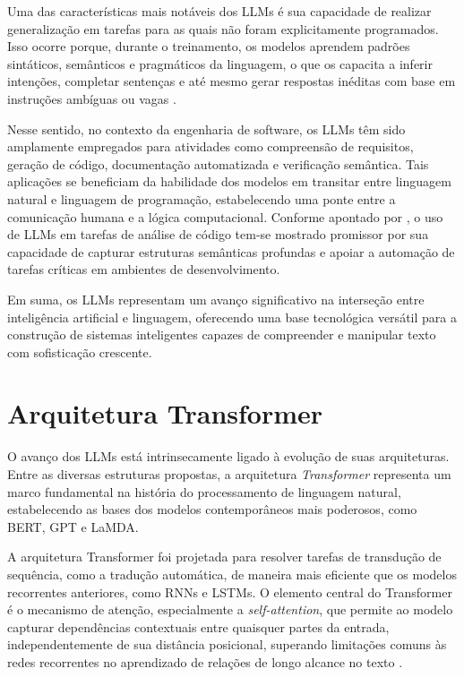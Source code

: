 Uma das características mais notáveis dos LLMs é sua capacidade de realizar generalização em tarefas para as quais não foram explicitamente programados. Isso ocorre porque, durante o treinamento, os modelos aprendem padrões sintáticos, semânticos e pragmáticos da linguagem, o que os capacita a inferir intenções, completar sentenças e até mesmo gerar respostas inéditas com base em instruções ambíguas ou vagas \cite{liu2024hallucinations, fan2023llmsw}.

Nesse sentido, no contexto da engenharia de software, os LLMs têm sido amplamente empregados para atividades como compreensão de requisitos, geração de código, documentação automatizada e verificação semântica. Tais aplicações se beneficiam da habilidade dos modelos em transitar entre linguagem natural e linguagem de programação, estabelecendo uma ponte entre a comunicação humana e a lógica computacional. Conforme apontado por , o uso de LLMs em tarefas de análise de código tem-se mostrado promissor por sua capacidade de capturar estruturas semânticas profundas e apoiar a automação de tarefas críticas em ambientes de desenvolvimento.

Em suma, os LLMs representam um avanço significativo na interseção entre inteligência artificial e linguagem, oferecendo uma base tecnológica versátil para a construção de sistemas inteligentes capazes de compreender e manipular texto com sofisticação crescente.

\section{Arquitetura Transformer}

O avanço dos LLMs está intrinsecamente ligado à evolução de suas arquiteturas. Entre as diversas estruturas propostas, a arquitetura \textit{Transformer} representa um marco fundamental na história do processamento de linguagem natural, estabelecendo as bases dos modelos contemporâneos mais poderosos, como BERT, GPT e LaMDA.

A arquitetura Transformer foi projetada para resolver tarefas de transdução de sequência, como a tradução automática, de maneira mais eficiente que os modelos recorrentes anteriores, como RNNs e LSTMs. O elemento central do Transformer é o mecanismo de atenção, especialmente a \textit{self-attention}, que permite ao modelo capturar dependências contextuais entre quaisquer partes da entrada, independentemente de sua distância posicional, superando limitações comuns às redes recorrentes no aprendizado de relações de longo alcance no texto \cite{vaswani2017}.

